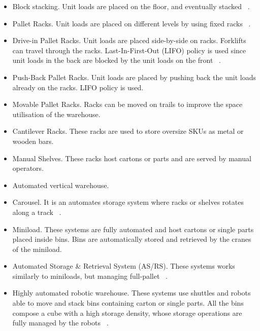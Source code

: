 \begin{itemize}
    \item Block stacking. Unit loads are placed on the floor, and eventually stacked ~\cite{Accorsi2017b, Goetschalckx1991, Nishi2010}.
    \item Pallet Racks. Unit loads are placed on different levels by using fixed racks ~\cite{Azadivar1989, Bassan1980, Bortolini2015a, Cardona2013, Roberts1972, Thomas2013}.
    \item Drive-in Pallet Racks. Unit loads are placed side-by-side on racks. Forklifts can travel through the racks. Last-In-First-Out (LIFO) policy is used since unit loads in the back are blocked by the unit loads on the front ~\cite{Manzini2016}.
    \item Push-Back Pallet Racks. Unit loads are placed by pushing back the unit loads already on the racks. LIFO policy is used.
    \item Movable Pallet Racks. Racks can be moved on trails to improve the space utilisation of the warehouse.
    \item Cantilever Racks. These racks are used to store oversize SKUs as metal or wooden bars.
    \item Manual Shelves. These racks host cartons or parts and are served by manual operators.
    \item Automated vertical warehouse. 
    \item Carousel. It is an automates storage system where racks or shelves rotates along a track ~\cite{Hua2008, Hwang1994, Lee1988, Vickson1998}.
    \item Miniload. These systems are fully automated and host cartons or single parts placed inside bins. Bins are automatically stored and retrieved by the cranes of the miniload.
    \item Automated Storage \& Retrieval System (AS/RS). These systems works similarly to miniloads, but managing full-pallet ~\cite{DeKoster2007, Karasawa1980, Manzini2006b, Regattieri2013, Rosenblatt1993, Tappia2015}.
    \item Highly automated robotic warehouse. These systems use shuttles and robots able to move and stack bins containing carton or single parts. All the bins compose a cube with a high storage density, whose storage operations are fully managed by the robots ~\cite{Lerher2016}.

\end{itemize}

